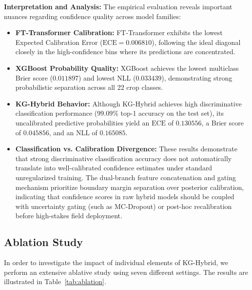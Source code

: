 \documentclass[journal]{IEEEtran}
\begin{document}
\textbf{Interpretation and Analysis:}
The empirical evaluation reveals important nuances regarding confidence quality across model families:
\begin{itemize}[leftmargin=1.2em]
    \item \textbf{FT-Transformer Calibration:} FT-Transformer exhibits the lowest Expected Calibration Error ($\text{ECE} = 0.006810$), following the ideal diagonal closely in the high-confidence bins where its predictions are concentrated.
    \item \textbf{XGBoost Probability Quality:} XGBoost achieves the lowest multiclass Brier score ($0.011897$) and lowest NLL ($0.033439$), demonstrating strong probabilistic separation across all 22 crop classes.
    \item \textbf{KG-Hybrid Behavior:} Although KG-Hybrid achieves high discriminative classification performance ($99.09\%$ top-1 accuracy on the test set), its uncalibrated predictive probabilities yield an $\text{ECE}$ of $0.130556$, a Brier score of $0.045856$, and an $\text{NLL}$ of $0.165085$.
    \item \textbf{Classification vs. Calibration Divergence:} These results demonstrate that strong discriminative classification accuracy does not automatically translate into well-calibrated confidence estimates under standard unregularized training. The dual-branch feature concatenation and gating mechanism prioritize boundary margin separation over posterior calibration, indicating that confidence scores in raw hybrid models should be coupled with uncertainty gating (such as MC-Dropout) or post-hoc recalibration before high-stakes field deployment.
\end{itemize}

\subsection{Ablation Study}

In order to investigate the impact of individual elements of KG-Hybrid, we perform an extensive ablative study using seven different settings. The results are illustrated in Table~\ref{tab:ablation}.
\end{document}
